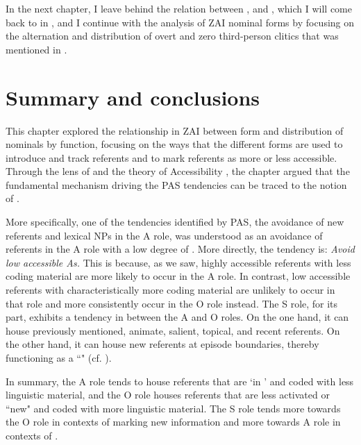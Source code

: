 In the next chapter, I leave behind the relation between ,  and , which I will come back to in , and I continue with the analysis of ZAI nominal forms by focusing on the alternation and distribution of overt and zero third-person clitics that was mentioned in . 




\section{Summary and conclusions}


This chapter explored the relationship in ZAI between form and distribution of nominals by function, focusing on the ways that the different forms are used to introduce and track referents and to mark referents as more or less accessible. Through the lens of  \citep{dubois2003a} and the theory of Accessibility \citep{ariel2001}, the chapter argued that the fundamental mechanism driving the PAS tendencies can be traced to the notion of . 

More specifically, one of the tendencies identified by PAS, the avoidance of new referents and lexical NPs in the A role, was understood as an avoidance of referents in the A role with a low degree of . More directly, the tendency is: \textit{Avoid low accessible As.} This is because, as we saw, highly accessible referents with less coding material are more likely to occur in the A role. In contrast, low accessible referents with characteristically more coding material are unlikely to occur in that role and more consistently occur in the O role instead. The S role, for its part, exhibits a tendency in between the A and O roles. On the one hand, it can house previously mentioned, animate, salient, topical, and recent referents. On the other hand, it can house new referents at episode boundaries, thereby functioning as a ``" (cf. ).

In summary, the A role tends to house referents that are `in ' \citep{gundel1993} and coded with less linguistic material, and the O role houses referents that are less activated or ``new" and coded with more linguistic material. The S role tends more towards the O role in contexts of marking new information and more towards A role in contexts of .

